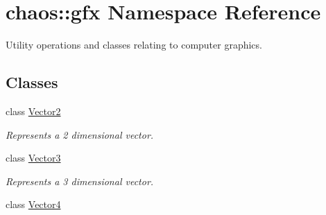 \hypertarget{namespacechaos_1_1gfx}{\section{chaos\-:\-:gfx Namespace Reference}
\label{namespacechaos_1_1gfx}
}


Utility operations and classes relating to computer graphics.  


\subsection*{Classes}
\begin{DoxyCompactItemize}
\item 
class \hyperlink{classchaos_1_1gfx_1_1_vector2}{Vector2}
\begin{DoxyCompactList}\small\item\em Represents a 2 dimensional vector. \end{DoxyCompactList}\item 
class \hyperlink{classchaos_1_1gfx_1_1_vector3}{Vector3}
\begin{DoxyCompactList}\small\item\em Represents a 3 dimensional vector. \end{DoxyCompactList}\item 
class \hyperlink{classchaos_1_1gfx_1_1_vector4}{Vector4}
\end{DoxyCompactItemize}

